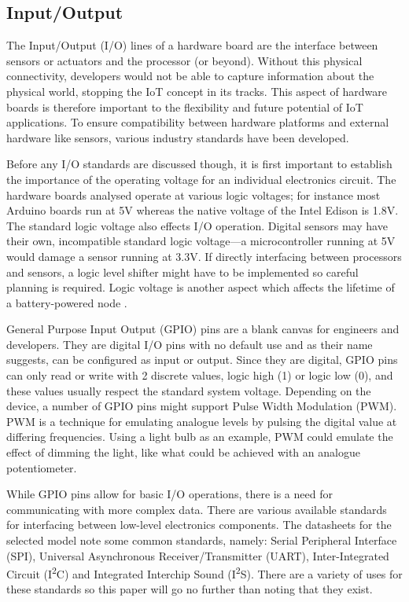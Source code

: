     \subsection{Input/Output}
      The Input/Output (I/O) lines of a hardware board are the interface between sensors or actuators and the processor (or beyond). Without this physical connectivity, developers would not be able to capture information about the physical world, stopping the IoT concept in its tracks. This aspect of hardware boards is therefore important to the flexibility and future potential of IoT applications. To ensure compatibility between hardware platforms and external hardware like sensors, various industry standards have been developed.

      Before any I/O standards are discussed though, it is first important to establish the importance of the operating voltage for an individual electronics circuit. The hardware boards analysed operate at various logic voltages; for instance most Arduino boards run at 5V whereas the native voltage of the Intel Edison is 1.8V. The standard logic voltage also effects I/O operation. Digital sensors may have their own, incompatible standard logic voltage---a microcontroller running at 5V would damage a sensor running at 3.3V. If directly interfacing between processors and sensors, a logic level shifter might have to be implemented so careful planning is required. Logic voltage is another aspect which affects the lifetime of a battery-powered node \citep{wsnpower:2010}.

      General Purpose Input Output (GPIO) pins are a blank canvas for engineers and developers. They are digital I/O pins with no default use and as their name suggests, can be configured as input or output. Since they are digital, GPIO pins can only read or write with 2 discrete values, logic high (1) or logic low (0), and these values usually respect the standard system voltage. Depending on the device, a number of GPIO pins might support Pulse Width Modulation (PWM). PWM is a technique for emulating analogue levels by pulsing the digital value at differing frequencies. Using a light bulb as an example, PWM could emulate the effect of dimming the light, like what could be achieved with an analogue potentiometer.

      While GPIO pins allow for basic I/O operations, there is a need for communicating with more complex data. There are various available standards for interfacing between low-level electronics components. The datasheets for the selected model note some common standards, namely: Serial Peripheral Interface (SPI), Universal Asynchronous Receiver/Transmitter (UART), Inter-Integrated Circuit (I\textsuperscript{2}C) and Integrated Interchip Sound (I\textsuperscript{2}S). There are a variety of uses for these standards so this paper will go no further than noting that they exist.

